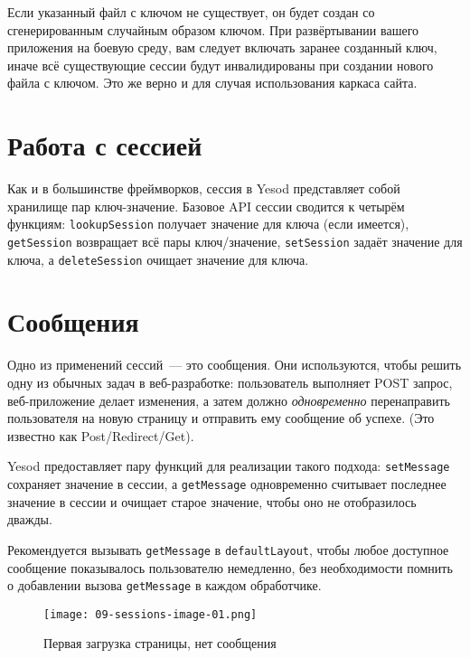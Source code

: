 \begin{remark}
    Если указанный файл с ключом не существует, он будет создан со
    сгенерированным случайным образом ключом. При развёртывании вашего
    приложения на боевую среду, вам следует включать заранее созданный ключ,
    иначе всё существующие сессии будут инвалидированы при создании нового
    файла с ключом. Это же верно и для случая использования каркаса сайта.
\end{remark}

\section{Работа с сессией}

Как и в большинстве фреймворков, сессия в Yesod представляет собой хранилище
пар ключ-значение. Базовое API сессии сводится к четырём функциям:
\lstinline'lookupSession' получает значение для ключа (если имеется),
\lstinline'getSession' возвращает всё пары ключ/значение,
\lstinline'setSession' задаёт значение для ключа, а \lstinline'deleteSession'
очищает значение для ключа.


\section{Сообщения}

Одно из применений сессий~--- это сообщения. Они используются, чтобы решить
одну из обычных задач в веб-разработке: пользователь выполняет POST запрос,
веб-приложение делает изменения, а затем должно \emph{одновременно}
перенаправить пользователя на новую страницу и отправить ему сообщение об
успехе. (Это известно как Post/Redirect/Get).

Yesod предоставляет пару функций для реализации такого подхода:
\lstinline'setMessage' сохраняет значение в сессии, а \lstinline'getMessage'
одновременно считывает последнее значение в сессии и очищает старое значение,
чтобы оно не отобразилось дважды.

Рекомендуется вызывать \lstinline'getMessage' в \lstinline'defaultLayout',
чтобы любое доступное сообщение показывалось пользователю немедленно, без
необходимости помнить о добавлении вызова \lstinline'getMessage' в каждом
обработчике.


\begin{figure}[tbh]
  \centering
  \texttt{[image: 09-sessions-image-01.png]}
  \caption{Первая загрузка страницы, нет сообщения}
\end{figure}

